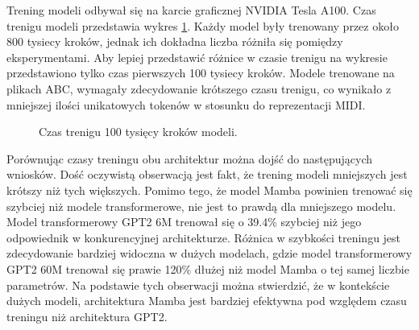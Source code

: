 \documentclass[data-science]{agh-wi} %
\begin{document}
Trening modeli odbywał się na karcie graficznej NVIDIA Tesla A100. Czas trenigu modeli przedstawia wykres \ref*{fig:czas_treningu}. Każdy model były trenowany przez około 800 tysiecy kroków, jednak ich dokładna liczba różniła się pomiędzy eksperymentami. Aby lepiej przedstawić różnice w czasie trenigu na wykresie przedstawiono tylko czas pierwszych 100 tysiecy kroków. Modele trenowane na plikach ABC, wymagały zdecydowanie krótszego czasu trenigu, co wynikało z mniejszej ilości unikatowych tokenów w stosunku do reprezentacji MIDI.

\begin{figure}[ht!]
    \centering
    \caption{Czas trenigu 100 tysięcy kroków modeli.}\label{fig:czas_treningu}
\end{figure}

Porównując czasy treningu obu architektur można dojść do następujących wniosków. Dość oczywistą obserwacją jest fakt, że trening modeli mniejszych jest krótszy niż tych większych. Pomimo tego, że model Mamba powinien trenować się szybciej niż modele transformerowe, nie jest to prawdą dla mniejszego modelu. Model transformerowy GPT2 6M trenował się o 39.4\% szybciej niż jego odpowiednik w konkurencyjnej architekturze. Różnica w szybkości treningu jest zdecydowanie bardziej widoczna w dużych modelach, gdzie model transformerowy GPT2 60M trenował się prawie 120\% dłużej niż model Mamba o tej samej liczbie parametrów. Na podstawie tych obserwacji można stwierdzić, że w kontekście dużych modeli, architektura Mamba jest bardziej efektywna pod względem czasu treningu niż architektura GPT2.
\end{document}
